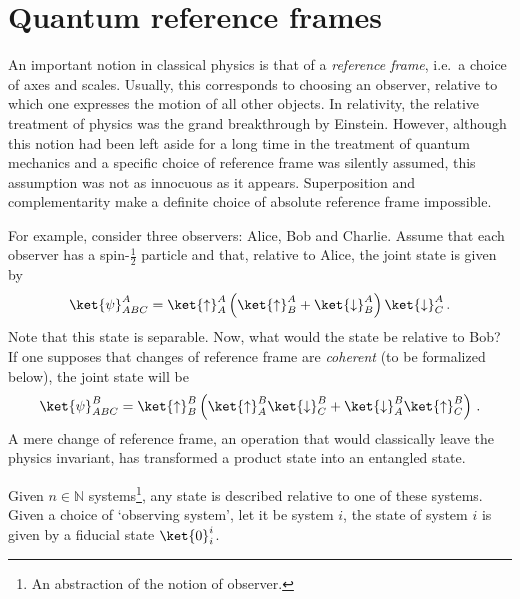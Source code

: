 \section{Quantum reference frames}

    An important notion in classical physics is that of a \textit{reference frame}, i.e.~a choice of axes and scales. Usually, this corresponds to choosing an observer, relative to which one expresses the motion of all other objects. In relativity, the relative treatment of physics was the grand breakthrough by Einstein. However, although this notion had been left aside for a long time in the treatment of quantum mechanics and a specific choice of reference frame was silently assumed, this assumption was not as innocuous as it appears. Superposition and complementarity make a definite choice of absolute reference frame impossible.

    For example, consider three observers: Alice, Bob and Charlie. Assume that each observer has a spin-$\tfrac{1}{2}$ particle and that, relative to Alice, the joint state is given by
    \begin{gather}
        \ket{\psi}^A_{ABC} = \ket{\uparrow}^A_A\left(\ket{\uparrow}^A_B+\ket{\downarrow}^A_B\right)\ket{\downarrow}^A_C\,.
    \end{gather}
    Note that this state is separable. Now, what would the state be relative to Bob? If one supposes that changes of reference frame are \textit{coherent} (to be formalized below), the joint state will be
    \begin{gather}
        \ket{\psi}^B_{ABC} = \ket{\uparrow}^B_B\left(\ket{\uparrow}^B_A\ket{\downarrow}^B_C+\ket{\downarrow}^B_A\ket{\uparrow}^B_C\right)\,.
    \end{gather}
    A mere change of reference frame, an operation that would classically leave the physics invariant, has transformed a product state into an entangled state.

    \begin{axiom}
        Given $n\in\mathbb{N}$ systems\footnote{An abstraction of the notion of observer.}, any state is described relative to one of these systems. Given a choice of `observing system', let it be system $i$, the state of system $i$ is given by a fiducial state $\ket{0}^i_i$.
    \end{axiom}


